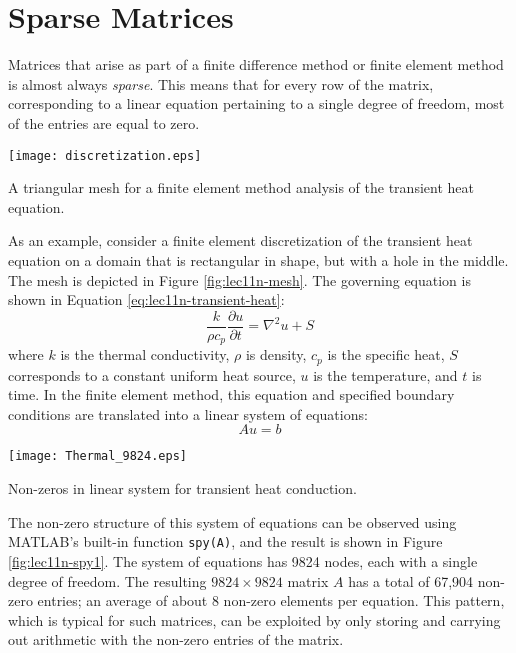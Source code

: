 \section{Sparse Matrices}

Matrices that arise as part of a finite difference method or finite element method is almost always \emph{sparse}.  This means that for every row of the matrix, corresponding to a linear equation pertaining to a single degree of freedom, most of the entries are equal to zero.  

\begin{marginfigure}[-4.0cm]
\texttt{[image: discretization.eps]}
\caption{A triangular mesh for a finite element method analysis of the transient heat equation.}
\label{fig:lec11n-mesh}
\end{marginfigure}
As an example, consider a finite element discretization of the transient heat equation on a domain that is rectangular in shape, but with a hole in the middle.  The mesh is depicted in Figure \ref{fig:lec11n-mesh}. The governing equation is shown in Equation \ref{eq:lec11n-transient-heat}:
\begin{equation}
\frac{k}{\rho c_p}\frac{\partial u}{\partial t} = \nabla^2 u + S
\label{eq:lec11n-transient-heat}
\end{equation}
where $k$ is the thermal conductivity, $\rho$ is density, $c_p$ is the specific heat, $S$ corresponds to a constant uniform heat source, $u$ is the temperature, and $t$ is time. In the finite element method, this equation and specified boundary conditions are translated into a linear system of equations:
\begin{equation*}
Au = b
\end{equation*} 
\begin{marginfigure}[-6.0cm]
\texttt{[image: Thermal\_9824.eps]}
\caption{Non-zeros in linear system for transient heat conduction.}
\label{fig:lec11n-spy1}
\end{marginfigure}
The non-zero structure of this system of equations can be observed using MATLAB's built-in function \lstinline[style=myMatlab]{spy(A)}, and the result is shown in Figure \ref{fig:lec11n-spy1}. The system of equations has 9824 nodes, each with a single degree of freedom.  The resulting $9824 \times 9824$ matrix $A$ has a total of 67,904 non-zero entries; an average of about 8 non-zero elements per equation. This pattern, which is typical for such matrices, can be exploited by only storing and carrying out arithmetic with the non-zero entries of the matrix.  

